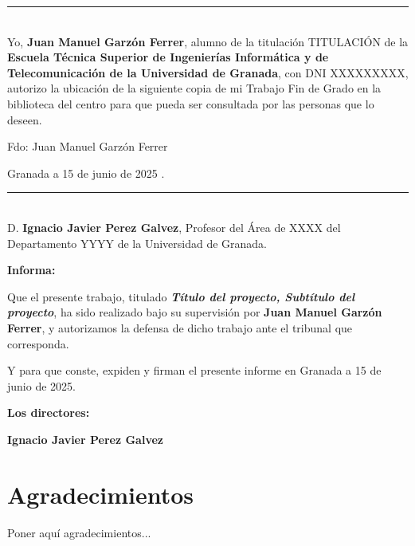 \newpage


\noindent\rule[-1ex]{\textwidth}{2pt}\\[4.5ex]

Yo, \textbf{Juan Manuel Garzón Ferrer}, alumno de la titulación TITULACIÓN de la \textbf{Escuela Técnica Superior
de Ingenierías Informática y de Telecomunicación de la Universidad de Granada}, con DNI XXXXXXXXX, autorizo la
ubicación de la siguiente copia de mi Trabajo Fin de Grado en la biblioteca del centro para que pueda ser
consultada por las personas que lo deseen.

\vspace{6cm}

\noindent Fdo: Juan Manuel Garzón Ferrer

\vspace{2cm}

\begin{flushright}
Granada a 15 de junio de 2025 .
\end{flushright}


\newpage

\noindent\rule[-1ex]{\textwidth}{2pt}\\[4.5ex]

D. \textbf{Ignacio Javier Perez Galvez}, Profesor del Área de XXXX del Departamento YYYY de la Universidad de Granada.



\textbf{Informa:}


Que el presente trabajo, titulado \textit{\textbf{Título del proyecto, Subtítulo del proyecto}}, ha sido realizado bajo su supervisión por \textbf{Juan Manuel Garzón Ferrer}, y autorizamos la defensa de dicho trabajo ante el tribunal que corresponda.

\vspace{0.5cm}

Y para que conste, expiden y firman el presente informe en Granada a 15 de junio de 2025.

\vspace{1cm}

\textbf{Los directores:}

\vspace{1cm}

\noindent \textbf{Ignacio Javier Perez Galvez}

\chapter*{Agradecimientos}

\vspace{1cm}

Poner aquí agradecimientos...
